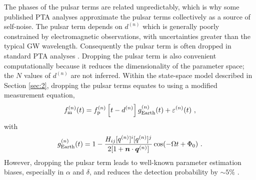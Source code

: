 \documentclass[fleqn,usenatbib,useAMS]{mnras}
\begin{document}
The phases of the pulsar terms are related unpredictably, which is why some published PTA analyses approximate the pulsar terms collectively as a source of self-noise. The pulsar term depends on $d^{(n)}$ which is generally poorly constrained by electromagnetic observations, with uncertainties greater than the typical GW wavelength. Consequently the pulsar term is often dropped in standard PTA analyses \citep[e.g.][]{Sesana2010,Babak2012,Petiteau2013,Zhu2015,Taylors2016,Goldstein2018,Charisi2023arXiv230403786C}. Dropping the pulsar term is also convenient computationally because it reduces the dimensionality of the parameter space; the $N$ values of $d^{(n)}$ are not inferred. Within the state-space model described in Section \ref{sec:2}, dropping the pulsar terms equates to using a modified measurement equation,
\begin{equation}
	f_{\rm m}^{(n)}(t) = f_{\rm p}^{(n)}\left [t-d^{(n)} \right ] g^{(n)}_{\rm Earth}(t) + \varepsilon^{(n)}(t) \ , 
	\label{eq:measuremen_earth}
\end{equation}
with
\begin{equation}
	g^{(n)}_{\rm Earth}(t) = 1 - \frac{ H_{ij}[q^{(n)}]^i [q^{(n)}]^j}{2[1 + \boldsymbol{n}\cdot \boldsymbol{q}^{(n)}] }  \cos(-\Omega t +\Phi_0)  \ .
	\label{eq:g_func_trig_earth}
\end{equation}
However, dropping the pulsar term leads to well-known parameter estimation biases, especially in $\alpha$ and $\delta$, and reduces the detection probability by $\sim 5 \%$ \citep{Zhupulsarterms,Chen2022,KimpsonPTA}. 
\end{document}

